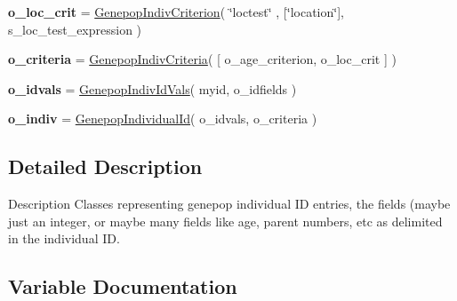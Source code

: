 \begin{DoxyCompactItemize}
\item 
{\bfseries o\+\_\+loc\+\_\+crit} = \hyperlink{classnegui_1_1genepopindividualid_1_1GenepopIndivCriterion}{Genepop\+Indiv\+Criterion}( \char`\"{}loctest\char`\"{} , \mbox{[}\char`\"{}location\char`\"{}\mbox{]}, s\+\_\+loc\+\_\+test\+\_\+expression )\hypertarget{namespacenegui_1_1genepopindividualid_aaa0728cd01ca9dbbb1919d41478eec78}{}\label{namespacenegui_1_1genepopindividualid_aaa0728cd01ca9dbbb1919d41478eec78}

\item 
{\bfseries o\+\_\+criteria} = \hyperlink{classnegui_1_1genepopindividualid_1_1GenepopIndivCriteria}{Genepop\+Indiv\+Criteria}( \mbox{[} o\+\_\+age\+\_\+criterion, o\+\_\+loc\+\_\+crit \mbox{]} )\hypertarget{namespacenegui_1_1genepopindividualid_af6026e78323bff4fd02a1db918cc6156}{}\label{namespacenegui_1_1genepopindividualid_af6026e78323bff4fd02a1db918cc6156}

\item 
{\bfseries o\+\_\+idvals} = \hyperlink{classnegui_1_1genepopindividualid_1_1GenepopIndivIdVals}{Genepop\+Indiv\+Id\+Vals}( myid, o\+\_\+idfields )\hypertarget{namespacenegui_1_1genepopindividualid_abdc9158cbe2c462b7a12cbed1143d3d8}{}\label{namespacenegui_1_1genepopindividualid_abdc9158cbe2c462b7a12cbed1143d3d8}

\item 
{\bfseries o\+\_\+indiv} = \hyperlink{classnegui_1_1genepopindividualid_1_1GenepopIndividualId}{Genepop\+Individual\+Id}( o\+\_\+idvals, o\+\_\+criteria )\hypertarget{namespacenegui_1_1genepopindividualid_a2b314f17d5dab8a90242e6ee0fa90990}{}\label{namespacenegui_1_1genepopindividualid_a2b314f17d5dab8a90242e6ee0fa90990}

\end{DoxyCompactItemize}


\subsection{Detailed Description}
\begin{DoxyVerb}Description
Classes representing genepop individual ID
entries, the fields (maybe just an integer,
or maybe many fields like age, parent numbers,
etc as delimited in the individual ID.
\end{DoxyVerb}
 

\subsection{Variable Documentation}
